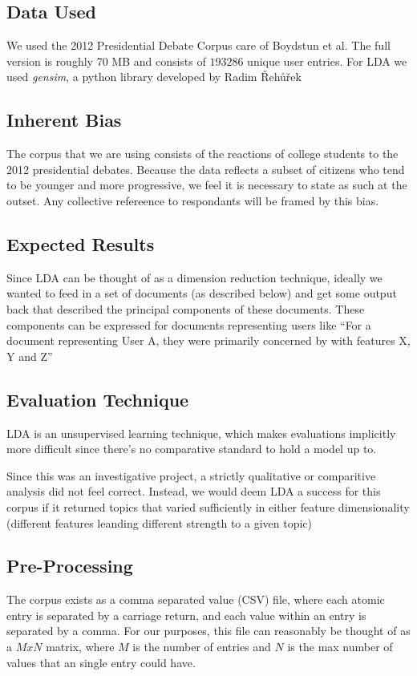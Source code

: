 \subsection{Data Used}
We used the 2012  Presidential Debate Corpus care of Boydstun et al. The full version is roughly 70 MB and consists of  $193286$ unique user entries.
For LDA we used \emph{gensim}, a python library developed by Radim Řehůřek \cite{gensim}

\subsection{Inherent Bias}
The corpus that we are using consists of the reactions of college students to the 2012 presidential debates. Because the data reflects a subset of citizens who tend to be younger and more progressive, we feel it is necessary to state as such at the outset. Any collective refereence to respondants will be framed by this bias.

\subsection{Expected Results}
Since LDA can be thought of as a dimension reduction technique, ideally we wanted to feed in a set of documents (as described below) and get some output back that described the principal components of these documents. These components can be expressed for documents representing users like ``For a document representing User A, they were primarily concerned by with features X, Y and Z''

\subsection{Evaluation Technique}
LDA is an unsupervised learning technique, which makes evaluations implicitly more difficult since there's no comparative standard to hold a model up to.

Since this was an investigative project, a strictly qualitative or comparitive analysis did not feel correct. Instead, we would deem LDA a success for this corpus if it returned topics that varied sufficiently in either feature dimensionality (different features leanding different strength to a given topic) 

\subsection{Pre-Processing}
The corpus exists as a comma separated value (CSV) file, where each atomic entry is separated by a carriage return, and each value within an entry is separated by a comma. For our purposes, this file can reasonably be thought of as a $MxN$ matrix, where $M$ is the number of entries and $N$ is the max number of values that an single entry could have.


